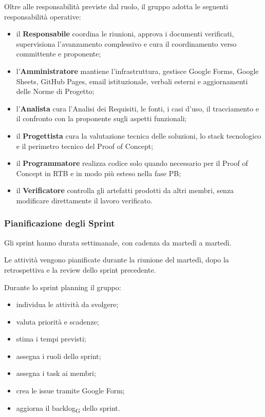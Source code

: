 Oltre alle responsabilità previste dal ruolo, il gruppo adotta le seguenti
responsabilità operative:

\begin{itemize}
    \item il \textbf{Responsabile} coordina le riunioni, approva i documenti
    verificati, supervisiona l'avanzamento complessivo e cura il coordinamento
    verso committente e proponente;

    \item l'\textbf{Amministratore} mantiene l'infrastruttura, gestisce Google
    Forms, Google Sheets, GitHub Pages,
    email istituzionale, verbali esterni e aggiornamenti delle Norme di Progetto;

    \item l'\textbf{Analista} cura l'Analisi dei Requisiti, le fonti, i casi d'uso,
    il tracciamento e il confronto con la proponente sugli aspetti funzionali;

    \item il \textbf{Progettista} cura la valutazione tecnica delle soluzioni,
    lo stack tecnologico e il perimetro tecnico del Proof of Concept;

    \item il \textbf{Programmatore} realizza codice solo quando necessario per il
    Proof of Concept in RTB e in modo più esteso nella fase PB;

    \item il \textbf{Verificatore} controlla gli artefatti prodotti da altri membri,
    senza modificare direttamente il lavoro verificato.
\end{itemize}


\subsubsection{Pianificazione degli Sprint}

Gli sprint hanno durata settimanale, con cadenza da martedì a martedì.

Le attività vengono pianificate durante la riunione del martedì, dopo la
retrospettiva e la review dello sprint precedente.

Durante lo sprint planning il gruppo:

\begin{itemize}
    \item individua le attività da svolgere;
    \item valuta priorità e scadenze;
    \item stima i tempi previsti;
    \item assegna i ruoli dello sprint;
    \item assegna i task ai membri;
    \item crea le issue tramite Google Form;
    \item aggiorna il backlog\textsubscript{G} dello sprint.
\end{itemize}

